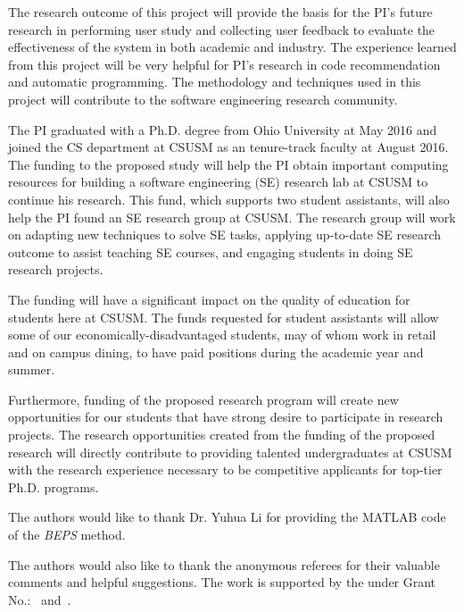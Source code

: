 The research outcome of this project will provide the basis for the PI's future research in performing user study and collecting user feedback to evaluate the effectiveness of the system in both academic and industry. The experience learned from this project will be very helpful for PI's research in code recommendation and automatic programming. The methodology and techniques used in this project will contribute to the software engineering research community.

The PI graduated with a Ph.D. degree from Ohio University at May 2016 and joined the CS department at CSUSM as an tenure-track faculty at August 2016. The funding to the proposed study will help the PI obtain important computing resources for building a software engineering (SE) research lab at CSUSM to continue his research. This fund, which supports two student assistants, will also help the PI found an SE research group at CSUSM. The research group will work on adapting new techniques to solve SE tasks, applying up-to-date SE research outcome to assist teaching SE courses, and engaging students in doing SE research projects.

The funding will have a significant impact on the quality of education for students here at CSUSM. The funds requested for student assistants will allow some of our economically-disadvantaged students, may of whom work in retail and on campus dining, to have paid positions during the academic year and summer.

Furthermore, funding of the proposed research program will create new opportunities for our students that have strong desire to participate in research projects. The research opportunities created from the funding of the proposed research will directly contribute to providing talented undergraduates at CSUSM with the research experience necessary to be competitive applicants for top-tier Ph.D. programs.

\begin{acks}
  The authors would like to thank Dr. Yuhua Li for providing the
  MATLAB code of the \textit{BEPS} method.

  The authors would also like to thank the anonymous referees for
  their valuable comments and helpful suggestions. The work is
  supported by the  under Grant
  No.:~
  and~.

\end{acks}
